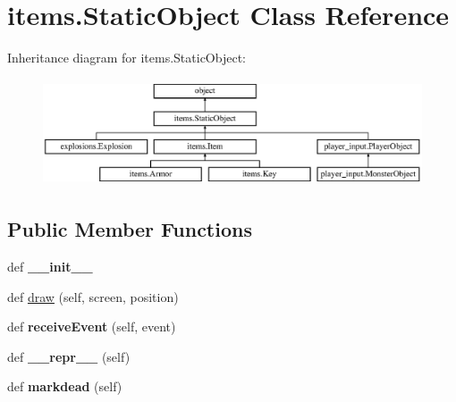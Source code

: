 \hypertarget{classitems_1_1_static_object}{}\section{items.\+Static\+Object Class Reference}
\label{classitems_1_1_static_object}
Inheritance diagram for items.\+Static\+Object\+:\begin{figure}[H]
\begin{center}
\leavevmode
\includegraphics[height=3.163842cm]{classitems_1_1_static_object}
\end{center}
\end{figure}
\subsection*{Public Member Functions}
\begin{DoxyCompactItemize}
\item 
\hypertarget{classitems_1_1_static_object_ac590040611a192bb8a2597e860724edf}{}def {\bfseries \+\_\+\+\_\+init\+\_\+\+\_\+}\label{classitems_1_1_static_object_ac590040611a192bb8a2597e860724edf}

\item 
def \hyperlink{classitems_1_1_static_object_aa7627ab4f30471d813295f3b1eb8bdd2}{draw} (self, screen, position)
\item 
\hypertarget{classitems_1_1_static_object_a0c895afdbd62e6404880cf397c58b48d}{}def {\bfseries receive\+Event} (self, event)\label{classitems_1_1_static_object_a0c895afdbd62e6404880cf397c58b48d}

\item 
\hypertarget{classitems_1_1_static_object_a76bf587a60ab56d4f64504b2573b53d6}{}def {\bfseries \+\_\+\+\_\+repr\+\_\+\+\_\+} (self)\label{classitems_1_1_static_object_a76bf587a60ab56d4f64504b2573b53d6}

\item 
\hypertarget{classitems_1_1_static_object_afa1615de439bb8451ae5766a7e2e8183}{}def {\bfseries markdead} (self)\label{classitems_1_1_static_object_afa1615de439bb8451ae5766a7e2e8183}

\end{DoxyCompactItemize}
